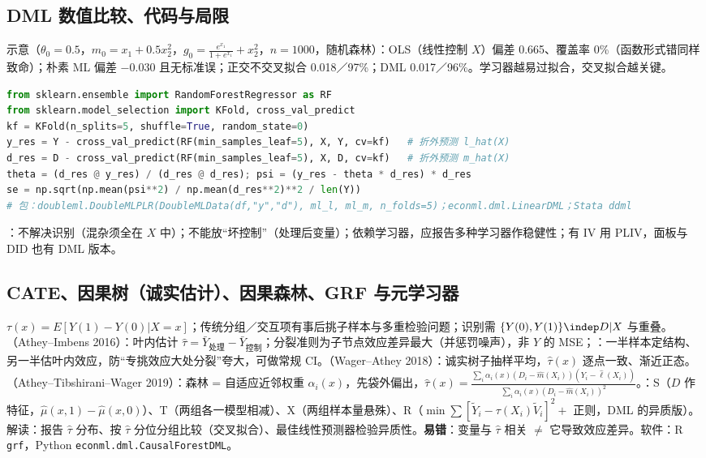 \subsection{DML 数值比较、代码与局限}
示意（$\theta_0=0.5$，$m_0=x_1+0.5x_2^2$，$g_0=\frac{e^{x_1}}{1+e^{x_1}}+x_2^2$，$n=1000$，随机森林）：OLS（线性控制 $X$）偏差 0.665、覆盖率 0\%（函数形式错同样致命）；朴素 ML 偏差 $-0.030$ 且无标准误；正交不交叉拟合 0.018／97\%；DML 0.017／96\%。学习器越易过拟合，交叉拟合越关键。
\begin{lstlisting}[language=Python,basicstyle=\ttfamily\footnotesize]
from sklearn.ensemble import RandomForestRegressor as RF
from sklearn.model_selection import KFold, cross_val_predict
kf = KFold(n_splits=5, shuffle=True, random_state=0)
y_res = Y - cross_val_predict(RF(min_samples_leaf=5), X, Y, cv=kf)   # 折外预测 l_hat(X)
d_res = D - cross_val_predict(RF(min_samples_leaf=5), X, D, cv=kf)   # 折外预测 m_hat(X)
theta = (d_res @ y_res) / (d_res @ d_res); psi = (y_res - theta * d_res) * d_res
se = np.sqrt(np.mean(psi**2) / np.mean(d_res**2)**2 / len(Y))
# 包：doubleml.DoubleMLPLR(DoubleMLData(df,"y","d"), ml_l, ml_m, n_folds=5)；econml.dml.LinearDML；Stata ddml
\end{lstlisting}
：不解决识别（混杂须全在 $X$ 中）；不能放“坏控制”（处理后变量）；依赖学习器，应报告多种学习器作稳健性；有 IV 用 PLIV，面板与 DID 也有 DML 版本。

\subsection{CATE、因果树（诚实估计）、因果森林、GRF 与元学习器}
 $\tau(x)=E[Y(1)-Y(0)|X=x]$；传统分组／交互项有事后挑子样本与多重检验问题；识别需 $\{Y(0),Y(1)\}\indep D|X$ 与重叠。（Athey–Imbens 2016）：叶内估计 $\hat\tau=\bar Y_{\text{处理}}-\bar Y_{\text{控制}}$；分裂准则为子节点效应差异最大（并惩罚噪声），非 $Y$ 的 MSE；：一半样本定结构、另一半估叶内效应，防“专挑效应大处分裂”夸大，可做常规 CI。（Wager–Athey 2018）：诚实树子抽样平均，$\hat\tau(x)$ 逐点一致、渐近正态。（Athey–Tibshirani–Wager 2019）：森林 = 自适应近邻权重 $\alpha_i(x)$，先袋外偏出，$\hat\tau(x)=\frac{\sum_i\alpha_i(x)(D_i-\hat m(X_i))(Y_i-\hat\ell(X_i))}{\sum_i\alpha_i(x)(D_i-\hat m(X_i))^2}$。：S（$D$ 作特征，$\hat\mu(x,1)-\hat\mu(x,0)$）、T（两组各一模型相减）、X（两组样本量悬殊）、R（$\min\sum[\tilde Y_i-\tau(X_i)\tilde V_i]^2+$ 正则，DML 的异质版）。解读：报告 $\hat\tau$ 分布、按 $\hat\tau$ 分位分组比较（交叉拟合）、最佳线性预测器检验异质性。\textbf{易错}：变量与 $\hat\tau$ 相关 $\ne$ 它导致效应差异。软件：R \texttt{grf}，Python \texttt{econml.dml.CausalForestDML}。

